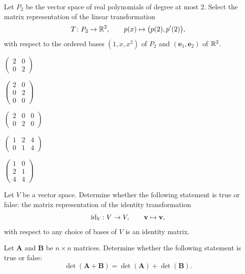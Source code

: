 \documentclass[11pt,oneside]{article}
\begin{document}
\begin{problem}
Let $P_2$ be the vector space of real polynomials of degree at most $2$. Select the matrix representation of the linear transformation
\[
T\colon P_2\to\mathbb{R}^2,
\qquad
p(x)\mapsto\bigl(p(2),p'(2)\bigr),
\]
with respect to the ordered bases $(1,x,x^2)$ of $P_2$ and $(\mathbf e_1,\mathbf e_2)$ of $\mathbb{R}^2$.
\begin{problemchoices}
\item $\displaystyle\begin{pmatrix}2&0\\0&2\end{pmatrix}$
\item $\displaystyle\begin{pmatrix}2&0\\0&2\\0&0\end{pmatrix}$
\item $\displaystyle\begin{pmatrix}2&0&0\\0&2&0\end{pmatrix}$
\item $\displaystyle\begin{pmatrix}1&2&4\\0&1&4\end{pmatrix}$
\item $\displaystyle\begin{pmatrix}1&0\\2&1\\4&4\end{pmatrix}$
\end{problemchoices}
\end{problem}

\begin{problem}
Let $V$ be a vector space. Determine whether the following statement is true or false: the matrix representation of the identity transformation
\[
\operatorname{id}_V\colon V\to V,
\qquad
\mathbf v\mapsto\mathbf v,
\]
with respect to any choice of bases of $V$ is an identity matrix.
\end{problem}

\begin{problem}
Let $\mathbf A$ and $\mathbf B$ be $n\times n$ matrices. Determine whether the following statement is true or false:
\[
\det(\mathbf A+\mathbf B)=\det(\mathbf A)+\det(\mathbf B).
\]
\end{problem}
\end{document}
